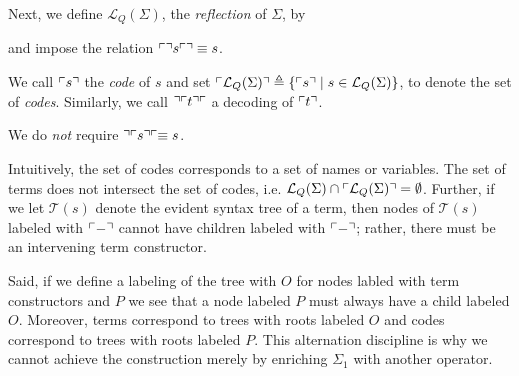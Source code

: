 Next, we define $\mathcal{L}_{Q}(\Sigma)$, the \emph{reflection} of $\Sigma$, by 

\begin{definition}

  and impose the relation $\ulcorner \urcorner s \ulcorner \urcorner \equiv s$.

  We call $\ulcorner s \urcorner$ the \emph{code} of $s$ and set
  $\ulcorner \mathcal{L}_{Q}(\Sigma) \urcorner \triangleq \{ \ulcorner s \urcorner \; | \; s
  \in \mathcal{L}_{Q}(\Sigma) \}$, to denote the set of
  \emph{codes}. Similarly, we call $\urcorner \ulcorner t \urcorner \ulcorner$ a decoding of
  $\ulcorner t \urcorner$.

\end{definition}

\begin{remark}
  We do \emph{not} require $\urcorner \ulcorner s \urcorner \ulcorner \equiv s$.
\end{remark}
\begin{remark}
  Intuitively, the set of codes corresponds to a set of names or
  variables. The set of terms does not intersect the set of codes,
  i.e. $\mathcal{L}_{Q}(\Sigma) \cap \ulcorner \mathcal{L}_{Q}(\Sigma) \urcorner
  = \emptyset$. Further, if we let $\mathcal{T}(s)$ denote the evident
  syntax tree of a term, then nodes of $\mathcal{T}(s)$ labeled with
  $\ulcorner - \urcorner$ cannot have children labeled with $\ulcorner - \urcorner$; rather,
  there must be an intervening term constructor.

  Said, if we define a labeling of the tree with $O$ for nodes labled
  with term constructors and $P$ we see that a node labeled $P$ must
  always have a child labeled $O$. Moreover, terms correspond to trees
  with roots labeled $O$ and codes correspond to trees with roots
  labeled $P$. This alternation discipline is why we cannot achieve
  the construction merely by enriching $\Sigma_{1}$ with another
  operator.
\end{remark}

